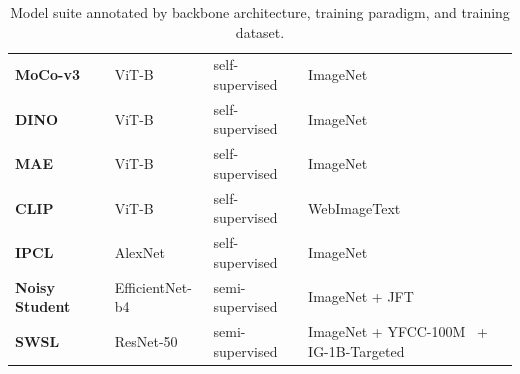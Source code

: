\documentclass{article}
\begin{document}
\begin{table}[htp!]
{\begin{tabular}{@{}llll@{}}
\textbf{\textcolor{MoCo-v3}{MoCo-v3}}~\cite{chen2021empirical} & ViT-B & self-supervised & ImageNet\\
\textbf{\textcolor{DINO}{DINO}}~\cite{caron2021emerging} & ViT-B & self-supervised & ImageNet\\
\textbf{\textcolor{MAE}{MAE}}~\cite{he2022masked} & ViT-B & self-supervised & ImageNet\\
\textbf{\textcolor{CLIP}{CLIP}}~\cite{radford2021learning} & ViT-B & self-supervised & WebImageText~\cite{radford2021learning}\\
\textbf{\textcolor{IPCL}{IPCL}}~\cite{konkle2021beyond} & AlexNet & self-supervised & ImageNet\\
\textbf{\textcolor{Noisy Student}{Noisy Student}}~\cite{xie2020self} & EfficientNet-b4 & semi-supervised & ImageNet + JFT~\cite{sun2017revisiting}\\
\textbf{\textcolor{SWSL}{SWSL}}~\cite{yalniz2019billion} &  ResNet-50  & semi-supervised & ImageNet + YFCC-100M~\cite{thomee2016yfcc100m} + IG-1B-Targeted~\cite{yalniz2019billion}\\
\bottomrule 
\end{tabular}%
\\
}
\vspace{1em}
\caption{Model suite annotated by backbone architecture, training paradigm, and training dataset.}
\vspace{-1em}
\label{tab:models}
\end{table}


\end{document}
